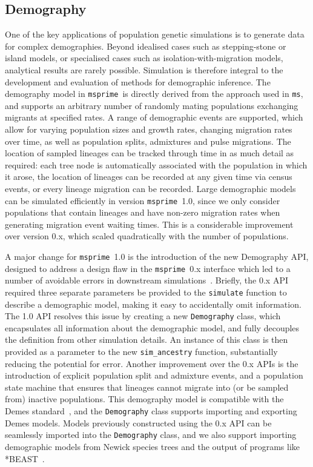 \documentclass{article}
\newcommand{\msprime}[0]{\texttt{msprime}}
\newcommand{\ms}[0]{\texttt{ms}}
\begin{document}
\subsection*{Demography}
\label{sec-demography}
One of the key applications of population genetic simulations is to generate
data for complex demographies. Beyond idealised cases such as stepping-stone or
island models, or specialised cases such as isolation-with-migration models,
analytical results are rarely possible. Simulation is therefore integral to the
development and evaluation of methods for demographic inference. The demography
model in \msprime\ is directly derived from the approach used in \ms, and
supports an arbitrary number of randomly mating populations exchanging migrants
at specified rates. A range of demographic events are supported, which allow for
varying population sizes and growth rates, changing migration rates over time,
as well as population splits, admixtures and pulse migrations.
The location of sampled lineages
can be tracked through time in as much detail as required: each tree node is
automatically associated with the population in which it arose, the location of
lineages can be recorded at any given time via census events, or every lineage
migration can be recorded.
Large demographic models can be simulated efficiently in version \msprime\ 1.0,
since we only consider populations that contain lineages and
have non-zero migration rates when generating migration event
waiting times. This is a considerable improvement
over version 0.x, which scaled quadratically with the number of populations.

A major change for \msprime\ 1.0 is the introduction of the new Demography API,
designed to address a design flaw in the \msprime\ 0.x interface which led to
a number of avoidable errors in downstream
simulations~\citep{ragsdale2020lessons}. Briefly, the 0.x API required three
separate parameters be provided to the \texttt{simulate} function to describe a
demographic model, making it easy to accidentally omit information. The 1.0 API
resolves this issue by creating a new \texttt{Demography} class, which
encapsulates all information about the demographic model, and fully decouples
the definition from other simulation details. An instance of this class is then
provided as a parameter to the new \texttt{sim\_ancestry} function,
substantially reducing the potential for error.
Another improvement over the
0.x APIs is the introduction of explicit population split and admixture events,
and a population state machine that ensures that lineages cannot migrate into
(or be sampled from) inactive populations. This demography model is compatible
with the Demes standard~\citep{gower2021demes}, and the \texttt{Demography}
class supports importing and exporting Demes models.
Models previously constructed using the 0.x API can be seamlessly imported into
the \texttt{Demography} class, and we also support importing demographic
models from Newick species trees and the output of programs
like *BEAST~\citep{heled2009bayesian}.
\end{document}

